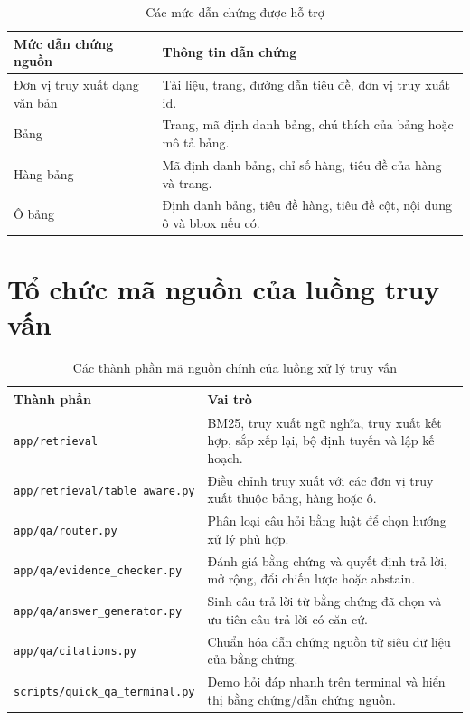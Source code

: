 \documentclass[../DoAn.tex]{subfiles}
\begin{document}
\begin{table}[H]
\centering
\small
\renewcommand{\arraystretch}{1.2}
\caption{Các mức dẫn chứng được hỗ trợ}
\label{tab:citation-levels-query}
\begin{tabularx}{\textwidth}{
    |>{\raggedright\arraybackslash}p{}
    |>{\raggedright\arraybackslash}X|
}
\hline
\textbf{Mức dẫn chứng nguồn} & \textbf{Thông tin dẫn chứng} \\
\hline
Đơn vị truy xuất dạng văn bản &
Tài liệu, trang, đường dẫn tiêu đề, đơn vị truy xuất id. \\
\hline
Bảng &
Trang, mã định danh bảng, chú thích của bảng hoặc mô tả bảng. \\
\hline
Hàng bảng &
Mã định danh bảng, chỉ số hàng, tiêu đề của hàng và trang. \\
\hline
Ô bảng &
Định danh bảng, tiêu đề hàng, tiêu đề cột, nội dung ô và bbox nếu có. \\
\hline
\end{tabularx}
\end{table}

\section{Tổ chức mã nguồn của luồng truy vấn}
\label{section:query-code-organization}

\begin{table}[H]
\centering
\small
\renewcommand{\arraystretch}{1.2}
\caption{Các thành phần mã nguồn chính của luồng xử lý truy vấn}
\label{tab:query-code-organization}
\begin{tabularx}{\textwidth}{
    |>{\raggedright\arraybackslash}p{}
    |>{\raggedright\arraybackslash}X|
}
\hline
\textbf{Thành phần} & \textbf{Vai trò} \\
\hline
\texttt{app/retrieval} &
BM25, truy xuất ngữ nghĩa, truy xuất kết hợp, sắp xếp lại, bộ định tuyến và lập kế hoạch. \\
\hline
\texttt{app/retrieval/table\_aware.py} &
Điều chỉnh truy xuất với các đơn vị truy xuất thuộc bảng, hàng hoặc ô. \\
\hline
\texttt{app/qa/router.py} &
Phân loại câu hỏi bằng luật để chọn hướng xử lý phù hợp. \\
\hline
\texttt{app/qa/evidence\_checker.py} &
Đánh giá bằng chứng và quyết định trả lời, mở rộng, đổi chiến lược hoặc abstain. \\
\hline
\texttt{app/qa/answer\_generator.py} &
Sinh câu trả lời từ bằng chứng đã chọn và ưu tiên câu trả lời có căn cứ. \\
\hline
\texttt{app/qa/citations.py} &
Chuẩn hóa dẫn chứng nguồn từ siêu dữ liệu của bằng chứng. \\
\hline
\texttt{scripts/quick\_qa\_terminal.py} &
Demo hỏi đáp nhanh trên terminal và hiển thị bằng chứng/dẫn chứng nguồn. \\
\hline
\end{tabularx}
\end{table}
\end{document}
